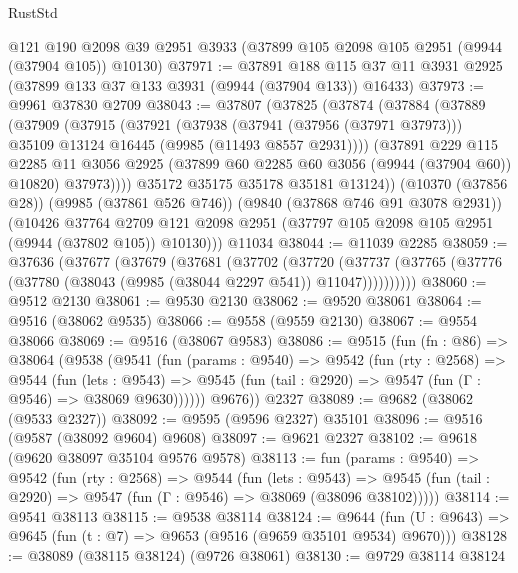 \begin{lexlean}{RustStd}
\begin{coremodule}
    @121
    @190
    @2098
    @39
    @2951
    @3933
    (@37899 @105 @2098 @105 @2951 (@9944 (@37904 @105)) @10130)
@37971 := @37891
    @188
    @115
    @37
    @11
    @3931
    @2925
    (@37899 @133 @37 @133 @3931 (@9944 (@37904 @133)) @16433)
@37973 := @9961 @37830 @2709
@38043 := @37807
    (@37825
      (@37874
        (@37884
          (@37889
            (@37909
              (@37915
                (@37921
                  (@37938
                    (@37941 (@37956 (@37971 @37973)))
                    @35109
                    @13124
                    @16445
                    (@9985 (@11493 @8557 @2931))))
                (@37891
                  @229
                  @115
                  @2285
                  @11
                  @3056
                  @2925
                  (@37899 @60 @2285 @60 @3056 (@9944 (@37904 @60)) @10820)
                  @37973))))
          @35172
          @35175
          @35178
          @35181
          @13124))
      (@10370 (@37856 @28))
      (@9985 (@37861 @526 @746))
      (@9840 (@37868 @746 @91 @3078 @2931))
      (@10426
        @37764
        @2709
        @121
        @2098
        @2951
        (@37797 @105 @2098 @105 @2951 (@9944 (@37802 @105)) @10130)))
    @11034
@38044 := @11039 @2285
@38059 := @37636
    (@37677
      (@37679
        (@37681
          (@37702
            (@37720
              (@37737 (@37765 (@37776 (@37780 (@38043 (@9985 (@38044 @2297 @541)) @11047))))))))))
@38060 := @9512 @2130
@38061 := @9530 @2130
@38062 := @9520 @38061
@38064 := @9516 (@38062 @9535)
@38066 := @9558 (@9559 @2130)
@38067 := @9554 @38066
@38069 := @9516 (@38067 @9583)
@38086 := @9515
    (fun (fn : @86) =>
    @38064
      (@9538
        (@9541
          (fun (params : @9540) =>
          @9542
            (fun (rty : @2568) =>
            @9544
              (fun (lets : @9543) =>
              @9545 (fun (tail : @2920) => @9547 (fun (Γ : @9546) => @38069 @9630))))))
        @9676))
    @2327
@38089 := @9682 (@38062 (@9533 @2327))
@38092 := @9595 (@9596 @2327) @35101
@38096 := @9516 (@9587 (@38092 @9604) @9608)
@38097 := @9621 @2327
@38102 := @9618 (@9620 @38097 @35104 @9576 @9578)
@38113 := fun (params : @9540) =>
  @9542
    (fun (rty : @2568) =>
    @9544
      (fun (lets : @9543) =>
      @9545 (fun (tail : @2920) => @9547 (fun (Γ : @9546) => @38069 (@38096 @38102)))))
@38114 := @9541 @38113
@38115 := @9538 @38114
@38124 := @9644
    (fun (U : @9643) => @9645 (fun (t : @7) => @9653 (@9516 (@9659 @35101 @9534) @9670)))
@38128 := @38089 (@38115 @38124) (@9726 @38061)
@38130 := @9729 @38114 @38124

\end{coremodule}
\end{lexlean}
